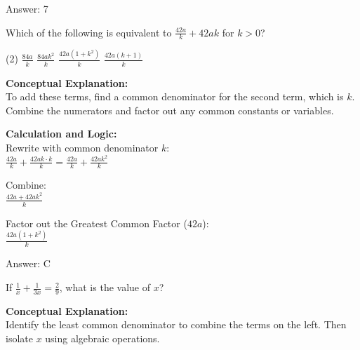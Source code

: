 \documentclass[11pt,paper=a4,answers]{exam}
\begin{document}
\begin{questions}
\begin{solution}
\vspace{25pt}

Answer: \colorbox{yellow!100}{7}
\end{solution}

\vspace{40pt}

\question
Which of the following is equivalent to $\frac{42a}{k} + 42ak$ for $k > 0$?
\begin{tasks}(2)
    \task $\frac{84a}{k}$
    \task $\frac{84ak^2}{k}$
    \task $\frac{42a(1+k^2)}{k}$
    \task $\frac{42a(k+1)}{k}$
\end{tasks}

\begin{solution}
\textbf{Conceptual Explanation:} \\
To add these terms, find a common denominator for the second term, which is $k$. Combine the numerators and factor out any common constants or variables.

\vspace{20pt}

\textbf{Calculation and Logic:} \\
Rewrite with common denominator $k$: \\
$\frac{42a}{k} + \frac{42ak \cdot k}{k} = \frac{42a}{k} + \frac{42ak^2}{k}$

\vspace{10pt}

Combine: \\
$\frac{42a + 42ak^2}{k}$

\vspace{10pt}

Factor out the Greatest Common Factor ($42a$): \\
$\frac{42a(1 + k^2)}{k}$

\vspace{25pt}

Answer: \colorbox{yellow!100}{C}
\end{solution}

\vspace{40pt}

\question
If $\frac{1}{x} + \frac{1}{3x} = \frac{2}{9}$, what is the value of $x$?

\begin{solution}
\textbf{Conceptual Explanation:} \\
Identify the least common denominator to combine the terms on the left. Then isolate $x$ using algebraic operations.


\end{solution}
\end{questions}
\end{document}
